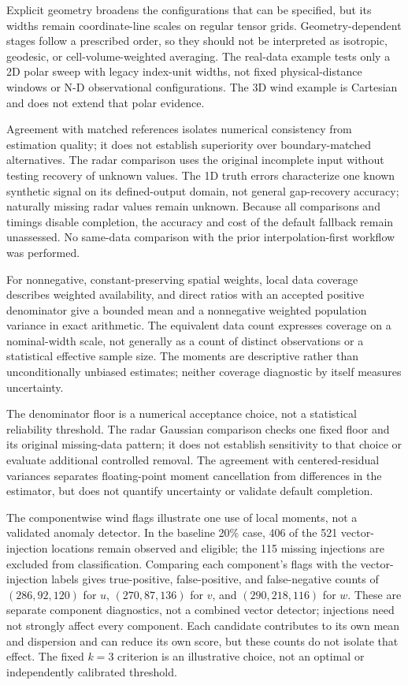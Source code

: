 \documentclass[a4paper,fleqn]{cas-sc}
\begin{document}
Explicit geometry broadens the configurations that can be specified, but its widths remain coordinate-line scales on regular tensor grids. Geometry-dependent stages follow a prescribed order, so they should not be interpreted as isotropic, geodesic, or cell-volume-weighted averaging. The real-data example tests only a 2D polar sweep with legacy index-unit widths, not fixed physical-distance windows or N-D observational configurations. The 3D wind example is Cartesian and does not extend that polar evidence.

Agreement with matched references isolates numerical consistency from estimation quality; it does not establish superiority over boundary-matched alternatives. The radar comparison uses the original incomplete input without testing recovery of unknown values. The 1D truth errors characterize one known synthetic signal on its defined-output domain, not general gap-recovery accuracy; naturally missing radar values remain unknown. Because all comparisons and timings disable completion, the accuracy and cost of the default fallback remain unassessed. No same-data comparison with the prior interpolation-first workflow was performed.

For nonnegative, constant-preserving spatial weights, local data coverage describes weighted availability, and direct ratios with an accepted positive denominator give a bounded mean and a nonnegative weighted population variance in exact arithmetic. The equivalent data count expresses coverage on a nominal-width scale, not generally as a count of distinct observations or a statistical effective sample size. The moments are descriptive rather than unconditionally unbiased estimates; neither coverage diagnostic by itself measures uncertainty.

The denominator floor is a numerical acceptance choice, not a statistical reliability threshold. The radar Gaussian comparison checks one fixed floor and its original missing-data pattern; it does not establish sensitivity to that choice or evaluate additional controlled removal. The agreement with centered-residual variances separates floating-point moment cancellation from differences in the estimator, but does not quantify uncertainty or validate default completion.

The componentwise wind flags illustrate one use of local moments, not a validated anomaly detector. In the baseline 20\% case, 406 of the 521 vector-injection locations remain observed and eligible; the 115 missing injections are excluded from classification. Comparing each component's flags with the vector-injection labels gives true-positive, false-positive, and false-negative counts of $(286,92,120)$ for $u$, $(270,87,136)$ for $v$, and $(290,218,116)$ for $w$. These are separate component diagnostics, not a combined vector detector; injections need not strongly affect every component. Each candidate contributes to its own mean and dispersion and can reduce its own score, but these counts do not isolate that effect. The fixed $k=3$ criterion is an illustrative choice, not an optimal or independently calibrated threshold.
\end{document}
